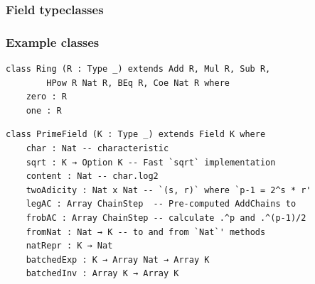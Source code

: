 \documentclass[options]{beamer}
\begin{document}
\begin{frame}
    \frametitle{Field typeclasses}



\end{frame}

\begin{frame}[fragile]
    \frametitle{Example classes}

\begin{verbatim}
class Ring (R : Type _) extends Add R, Mul R, Sub R, 
        HPow R Nat R, BEq R, Coe Nat R where
    zero : R
    one : R
\end{verbatim}

\begin{verbatim}
class PrimeField (K : Type _) extends Field K where
    char : Nat -- characteristic
    sqrt : K → Option K -- Fast `sqrt` implementation
    content : Nat -- char.log2
    twoAdicity : Nat x Nat -- `(s, r)` where `p-1 = 2^s * r'
    legAC : Array ChainStep  -- Pre-computed AddChains to
    frobAC : Array ChainStep -- calculate .^p and .^(p-1)/2
    fromNat : Nat → K -- to and from `Nat`' methods
    natRepr : K → Nat
    batchedExp : K → Array Nat → Array K
    batchedInv : Array K → Array K
\end{verbatim}

\end{frame}
\end{document}
